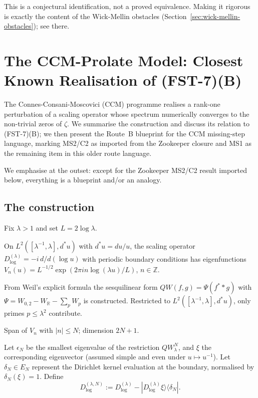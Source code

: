 \documentclass[11pt,a4paper]{article}
\theoremstyle{plain}
\theoremstyle{definition}
\newcommand{\R}{\mathbb{R}}
\newcommand{\Z}{\mathbb{Z}}
\begin{document}
This is a conjectural identification, not a proved equivalence.
Making it rigorous is exactly the content of the Wick-Mellin
obstacles (Section~\ref{sec:wick-mellin-obstacles}); see there.

\section{The CCM-Prolate Model: Closest Known Realisation of (FST-7)(B)}
\label{sec:ccm-prolate}

The Connes-Consani-Moscovici (CCM) programme
\cite{ConnesConsani2023,ConnesMoscovici2022,ConnesConsaniMoscovici2025}
realises a rank-one perturbation of a scaling operator whose spectrum
numerically converges to the non-trivial zeros of $\zeta$.  We
summarise the construction and discuss its relation to (FST-7)(B);
we then present the Route~B blueprint for the CCM missing-step
language, marking MS2/C2 as imported from the Zookeeper closure and
MS1 as the remaining item in this older route language.

We emphasise at the outset: except for the Zookeeper MS2/C2 result
imported below, everything is a blueprint and/or an analogy.

\subsection{The construction}
\label{sec:ccm-construction}

Fix $\lambda > 1$ and set $L = 2 \log\lambda$.

\begin{description}[leftmargin=*,style=nextline]
\item[\textbf{Scaling triple.}] On $L^2([\lambda^{-1}, \lambda],
  d^\ast u)$ with $d^\ast u = du/u$, the scaling operator
  $D^{(\lambda)}_{\log} = -i\,d/d(\log u)$ with periodic boundary
  conditions has eigenfunctions $V_n(u) = L^{-1/2}\exp(2\pi i n
  \log(\lambda u)/L)$, $n \in \Z$.
\item[\textbf{Weil quadratic form.}] From Weil's explicit formula
  the sesquilinear form $QW(f,g) = \Psi(f^\ast * g)$ with $\Psi =
  W_{0,2} - W_\R - \sum_p W_p$ is constructed.  Restricted to
  $L^2([\lambda^{-1}, \lambda], d^\ast u)$, only primes $p \leq
  \lambda^2$ contribute.
\item[\textbf{Test subspace $E_N$.}] Span of $V_n$ with $|n|
  \leq N$; dimension $2N+1$.
\item[\textbf{Rank-one perturbation.}] Let $\epsilon_N$ be the
  smallest eigenvalue of the restriction $QW_\lambda^N$, and $\xi$
  the corresponding eigenvector (assumed simple and even under $u
  \mapsto u^{-1}$).  Let $\delta_N \in E_N$ represent the Dirichlet
  kernel evaluation at the boundary, normalised by $\delta_N(\xi) =
  1$.  Define
  \[
     D^{(\lambda,N)}_{\log} := D^{(\lambda)}_{\log}
       - |D^{(\lambda)}_{\log}\xi\rangle\langle\delta_N|.
  \]
\end{description}
\end{document}
